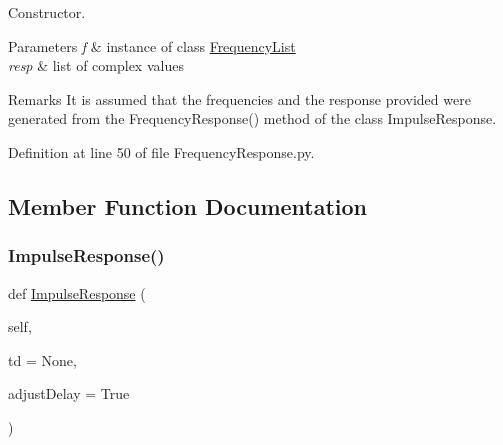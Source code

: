 Constructor. 


\begin{DoxyParams}{Parameters}
{\em f} & instance of class \hyperlink{namespaceSignalIntegrity_1_1FrequencyDomain_1_1FrequencyList}{Frequency\+List} \\
\hline
{\em resp} & list of complex values \\
\hline
\end{DoxyParams}
\begin{DoxyRemark}{Remarks}
It is assumed that the frequencies and the response provided were generated from the Frequency\+Response() method of the class Impulse\+Response. 
\end{DoxyRemark}


Definition at line 50 of file Frequency\+Response.\+py.



\subsection{Member Function Documentation}
\mbox{\label{classSignalIntegrity_1_1FrequencyDomain_1_1FrequencyResponse_1_1FrequencyResponse_aa301152e06c3881589eb5c70d53734f6}} 
\subsubsection{\texorpdfstring{Impulse\+Response()}{ImpulseResponse()}}
{\footnotesize\ttfamily def \hyperlink{classSignalIntegrity_1_1TimeDomain_1_1Waveform_1_1ImpulseResponse_1_1ImpulseResponse}{Impulse\+Response} (\begin{DoxyParamCaption}\item[{}]{self,  }\item[{}]{td = {\ttfamily None},  }\item[{}]{adjust\+Delay = {\ttfamily True} }\end{DoxyParamCaption})}



